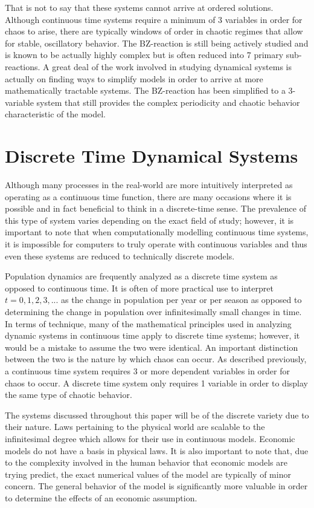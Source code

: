That is not to say that these systems cannot arrive at ordered solutions.  Although continuous time systems require a minimum of 3 variables in order for chaos to arise, there are typically windows of order in chaotic regimes that allow for stable, oscillatory behavior. The BZ-reaction is still being actively studied and is known to be actually highly complex but is often reduced into 7 primary sub-reactions\autocite{Field1986}. A great deal of the work involved in studying dynamical systems is actually on finding ways to simplify models in order to arrive at more mathematically tractable systems. The BZ-reaction has been simplified to a 3-variable system that still provides the complex periodicity and chaotic behavior characteristic of the model\autocite{Gyorgyi1992}.

\section{Discrete Time Dynamical Systems}
Although many processes in the real-world are more intuitively interpreted as operating as a continuous time  function, there are many  occasions where it is possible and  in fact beneficial to think in a discrete-time sense. The prevalence of this type of system varies depending on the exact field of study; however, it is important to note that when computationally modelling continuous time systems, it is impossible for computers to truly operate with continuous variables and thus even these systems are reduced to technically discrete models.

Population dynamics are frequently analyzed as a discrete time system as opposed to continuous time. It is often of more practical use to interpret $t= 0,1,2,3,...$ as the change in population per year or per season as opposed to determining the change in population over infinitesimally small changes in time. In terms of technique, many of the mathematical principles used in analyzing dynamic systems in continuous time apply to discrete time systems; however, it would be a mistake to assume the two were identical. An important distinction between the two is the nature by which chaos can occur. As described previously, a continuous time system requires 3 or more dependent variables in order for chaos to occur. A discrete time system only requires 1 variable in order to display the same type of chaotic behavior.

The systems discussed throughout this paper will be of the discrete variety due to their nature. Laws pertaining to the physical world are scalable to the infinitesimal degree which allows for their use in continuous models. Economic models do not have a basis in physical laws. It is also important to note that, due to the complexity involved in the human behavior that economic models are trying predict, the exact numerical values of the model are typically of minor concern. The general behavior of the model is significantly more valuable in order to determine the effects of an economic assumption.

